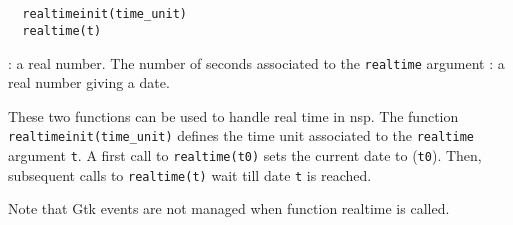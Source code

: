 %
%
\begin{mandesc}
   \\
   \\
\end{mandesc}
\label{realtimeinit}
\label{realtime}
\begin{calling_sequence}
\begin{verbatim}
  realtimeinit(time_unit)
  realtime(t)
\end{verbatim}
\end{calling_sequence}
\begin{parameters}
  \begin{varlist}
    : a real number. The number of seconds associated to the \verb!realtime! argument
    : a real number giving a date.
  \end{varlist}
\end{parameters}
\begin{mandescription}
  These two functions can be used to handle real time in nsp.
  The function \verb!realtimeinit(time_unit)! defines the time unit
  associated to the \verb!realtime! argument \verb!t!. A first call to
  \verb!realtime(t0)! sets the current date to (\verb!t0!). Then,
  subsequent calls to \verb!realtime(t)! wait till date \verb!t! is
  reached.

  Note that Gtk events are not managed when function realtime is called.
\end{mandescription}
